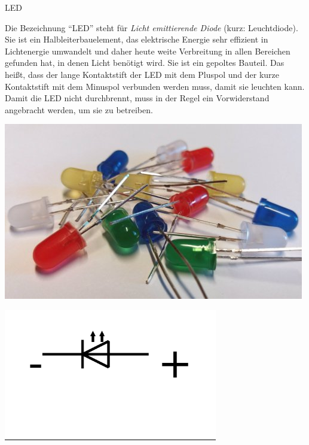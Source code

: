 \begin{zsfg}{LED}
	\begin{minipage}{0.7\textwidth}
		Die Bezeichnung \enquote{LED} steht für \emph{Licht emittierende Diode} (kurz: Leuchtdiode). Sie ist ein Halbleiterbauelement, das elektrische Energie sehr effizient in Lichtenergie umwandelt und daher heute weite Verbreitung in allen Bereichen gefunden hat, in denen Licht benötigt wird. Sie ist ein gepoltes Bauteil. Das heißt, dass der lange Kontaktstift der LED mit dem Pluspol und der kurze Kontaktstift mit dem Minuspol verbunden werden muss, damit sie leuchten kann. Damit die LED nicht durchbrennt, muss in der Regel ein Vorwiderstand angebracht werden, um sie zu betreiben.
	\end{minipage}
	\hfill
	\begin{minipage}{0.28\textwidth}
		\centering
		\includegraphics[width=\textwidth]{./pics/led-sammlung.jpg}
		
		\bigskip
		\includegraphics[width=0.7\textwidth]{./Zeichnungen/led-schaltsymbol.png}
	\end{minipage}
\end{zsfg}
